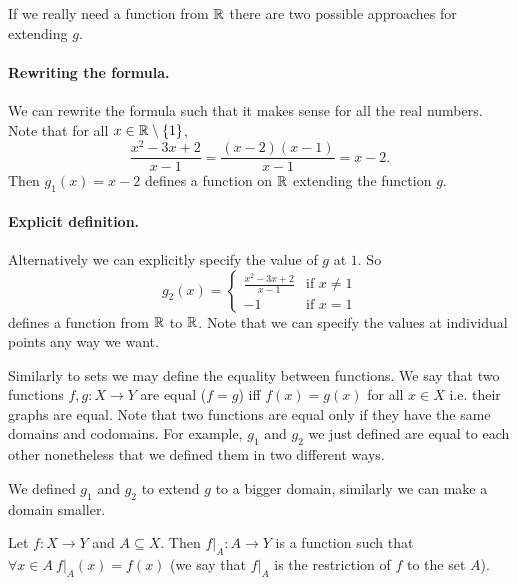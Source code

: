 If we really need a function from ${\mathbb{R}}$ there are two possible approaches for
extending $g$.

\paragraph{Rewriting the formula.}
We can rewrite the formula such that it makes sense for all the real numbers.
Note that for all $x \in \R \setminus \set{1}$,
\[
    \frac{x^2 - 3x + 2}{x - 1} = \frac{(x - 2)(x - 1)}{x - 1} = x - 2.
\]
Then $g_1(x) = x - 2$ defines a function on ${\mathbb{R}}$ extending the function $g$.

\paragraph{Explicit definition.} Alternatively we can explicitly specify the
value of $g$ at $1$. So
\[
    g_2(x) =
    \begin{cases}
        \frac{x^2 - 3x + 2}{x - 1} & \text{if } x \neq 1 \\
        -1 & \text{if } x = 1
    \end{cases}
\]
defines a function from ${\mathbb{R}}$ to ${\mathbb{R}}$. Note that we can specify the values at
individual points any way we want.

Similarly to sets we may define the equality between functions. We say that two
functions $f, g : X \to Y$ are equal ($f = g$) iff $f(x) = g(x)$ for all
$x \in X$ i.e. their graphs are equal. Note that two functions are equal only
if they have the same domains and codomains. For example, $g_1$ and $g_2$ we
just defined are equal to each other nonetheless that we defined them in two
different ways.

We defined $g_1$ and $g_2$ to extend $g$ to a bigger domain, similarly we can
make a domain smaller.
\begin{definition}
    Let $f : X \to Y$ and $A \subseteq X$. Then $f|_{A} : A \to Y$ is a function
    such that $\forall x \in A\ f|_{A}(x) = f(x)$ (we say that $f|_A$ is the
    restriction of $f$ to the set $A$).
\end{definition}


